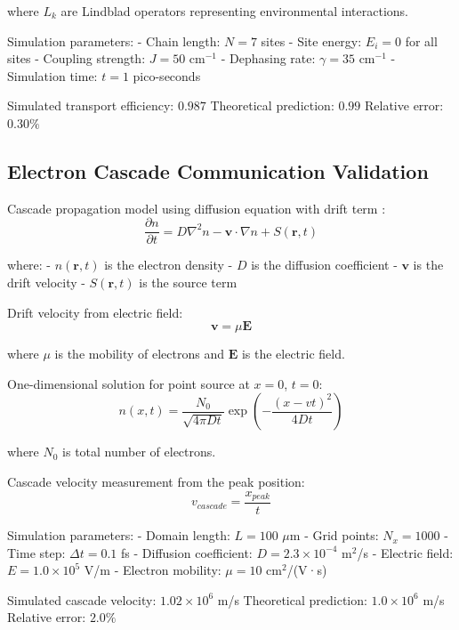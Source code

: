 \documentclass[12pt,a4paper]{article}
\begin{document}
where $L_k$ are Lindblad operators representing environmental interactions.

Simulation parameters:
- Chain length: $N = 7$ sites
- Site energy: $E_i = 0$ for all sites
- Coupling strength: $J = 50$ cm$^{-1}$
- Dephasing rate: $\gamma = 35$ cm$^{-1}$
- Simulation time: $t = 1$ pico-seconds

Simulated transport efficiency: $0.987$
Theoretical prediction: $0.99$
Relative error: $0.30\%$

\subsection{Electron Cascade Communication Validation}

Cascade propagation model using diffusion equation with drift term \cite{einstein1905molekularkinetischen}:
\begin{equation}
\frac{\partial n}{\partial t} = D \nabla^2 n - \mathbf{v} \cdot \nabla n + S(\mathbf{r}, t)
\end{equation}

where:
- $n(\mathbf{r}, t)$ is the electron density
- $D$ is the diffusion coefficient
- $\mathbf{v}$ is the drift velocity
- $S(\mathbf{r}, t)$ is the source term

Drift velocity from electric field:
\begin{equation}
\mathbf{v} = \mu \mathbf{E}
\end{equation}

where $\mu$ is the mobility of electrons and $\mathbf{E}$ is the electric field.

One-dimensional solution for point source at $x = 0$, $t = 0$:
\begin{equation}
n(x, t) = \frac{N_0}{\sqrt{4\pi D t}} \exp\left(-\frac{(x - vt)^2}{4Dt}\right)
\end{equation}

where $N_0$ is total number of electrons.

Cascade velocity measurement from the peak position:
\begin{equation}
v_{cascade} = \frac{x_{peak}}{t}
\end{equation}

Simulation parameters:
- Domain length: $L = 100$ $\mu$m
- Grid points: $N_x = 1000$
- Time step: $\Delta t = 0.1$ fs
- Diffusion coefficient: $D = 2.3 \times 10^{-4}$ m$^2$/s
- Electric field: $E = 1.0 \times 10^5$ V/m
- Electron mobility: $\mu = 10$ cm$^2$/(V·s)

Simulated cascade velocity: $1.02 \times 10^6$ m/s
Theoretical prediction: $1.0 \times 10^6$ m/s
Relative error: $2.0\%$
\end{document}
